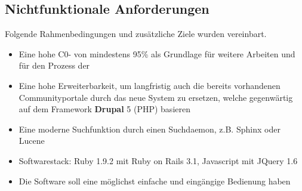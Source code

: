 \subsection{Nichtfunktionale Anforderungen}
Folgende Rahmenbedingungen und zusätzliche Ziele wurden vereinbart.

\begin{itemize}
 \item Eine hohe C0- von mindestens 95\% als Grundlage für weitere Arbeiten und für den Prozess der 
 \item Eine hohe Erweiterbarkeit, um langfristig auch die bereits vorhandenen Communityportale durch das neue System zu ersetzen, welche gegenwärtig auf dem Framework \textbf{Drupal} 5 (PHP) basieren
 \item Eine moderne Suchfunktion durch einen Suchdaemon, z.B. Sphinx oder Lucene
 \item Softwarestack: Ruby 1.9.2 mit Ruby on Rails 3.1, Javascript mit JQuery 1.6
 \item Die Software soll eine möglichst einfache und eingängige Bedienung haben
\end{itemize}

